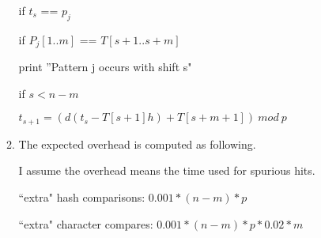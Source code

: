 \documentclass[11pt,letterpaper,oneside]{article}
\begin{document}
\begin{enumerate}
\begin{enumerate}
\hspace{6em}                if $t_s$ == $p_j$

\hspace{7em}                    if $P_j[1..m]$ == $T[s+1..s+m]$

\hspace{8em}                        print ''Pattern j occurs with shift s"

\hspace{4em}        if $s < n-m$

\hspace{5em}            $t_{s+1} = (d(t_s - T[s+1]h) + T[s+m+1])\ mod\ p$

\null

\item The expected overhead is computed as following.

I assume the overhead means the time used for spurious hits.

``extra" hash comparisons: $0.001*(n-m)*p$

``extra" character compares: $0.001*(n-m)*p * 0.02*m$

\end{enumerate}

\end{enumerate}
\end{document}
